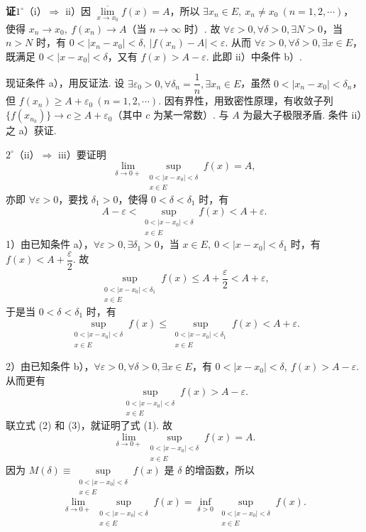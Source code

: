 \documentclass[UTF8, 12pt, fontset=fandol, oneside]{ctexart}
\begin{document}
\noindent\textbf{证}\quad $1^\circ$（i）$\Rightarrow$ ii）因 $\overline{\lim\limits_{x\to x_0}}f(x)=A$，所以 $\exists x_n\in E,\ x_n\ne x_0\ (n=1,2,\cdots)$，使得 $x_n\to x_0,\ f(x_n)\to A$（当 $n\to\infty$ 时）. 故 $\forall \varepsilon>0,\forall\delta>0,\exists N>0$，当 $n>N$ 时，有 $0<|x_n-x_0|<\delta,\ |f(x_n)-A|<\varepsilon$. 从而 $\forall \varepsilon>0,\forall\delta>0,\exists x\in E$，既满足 $0<|x-x_0|<\delta$，又有 $f(x)>A-\varepsilon$. 此即 ii）中条件 b）.

现证条件 a），用反证法. 设 $\exists\varepsilon_0>0,\forall \delta_n=\dfrac1n,\exists x_n\in E$，虽然 $0<|x_n-x_0|<\delta_n$，但 $f(x_n)\ge A+\varepsilon_0\ (n=1,2,\cdots)$. 因有界性，用致密性原理，有收敛子列 $\{f(x_{n_k})\}\to c\ge A+\varepsilon_0$（其中 $c$ 为某一常数）. 与 $A$ 为最大子极限矛盾. 条件 ii）之 a）获证.

$2^\circ$（ii）$\Rightarrow$ iii）要证明
\[
  \lim_{\delta\to0+}\sup_{\substack{0<|x-x_0|<\delta\\ x\in E}}f(x)=A,
\]
亦即 $\forall \varepsilon>0$，要找 $\delta_1>0$，使得 $0<\delta<\delta_1$ 时，有
\[
  A-\varepsilon<\sup_{\substack{0<|x-x_0|<\delta\\ x\in E}}f(x)<A+\varepsilon.
\tag{1}
\]
1）由已知条件 a），$\forall \varepsilon>0,\exists\delta_1>0$，当 $x\in E,\ 0<|x-x_0|<\delta_1$ 时，有 $f(x)<A+\dfrac{\varepsilon}{2}$. 故
\[
  \sup_{\substack{0<|x-x_0|<\delta_1\\ x\in E}}f(x)\le A+\frac{\varepsilon}{2}<A+\varepsilon,
\]
于是当 $0<\delta<\delta_1$ 时，有
\[
  \sup_{\substack{0<|x-x_0|<\delta\\ x\in E}}f(x)
  \le \sup_{\substack{0<|x-x_0|<\delta_1\\ x\in E}}f(x)<A+\varepsilon.
\tag{2}
\]

2）由已知条件 b），$\forall \varepsilon>0,\forall\delta>0,\exists x\in E$，有 $0<|x-x_0|<\delta,\ f(x)>A-\varepsilon$. 从而更有
\[
  \sup_{\substack{0<|x-x_0|<\delta\\ x\in E}}f(x)>A-\varepsilon.
\tag{3}
\]
联立式 (2) 和 (3)，就证明了式 (1). 故
\[
  \lim_{\delta\to0+}\sup_{\substack{0<|x-x_0|<\delta\\ x\in E}}f(x)=A.
\]
因为 $M(\delta)\equiv\sup\limits_{\substack{0<|x-x_0|<\delta\\ x\in E}}f(x)$ 是 $\delta$ 的增函数，所以
\[
  \lim_{\delta\to0+}\sup_{\substack{0<|x-x_0|<\delta\\ x\in E}}f(x)
  =\inf_{\delta>0}\sup_{\substack{0<|x-x_0|<\delta\\ x\in E}}f(x).
\]
\end{document}
